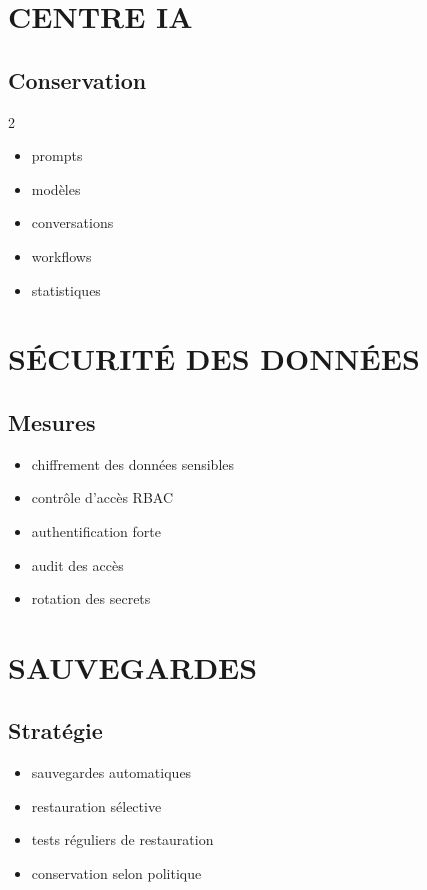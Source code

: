 \documentclass[12pt,a4paper,oneside]{book}
\begin{document}
\chapter{CENTRE IA}

\section{Conservation}
\begin{multicols}{2}
\begin{itemize}
\item prompts
\item modèles
\item conversations
\item workflows
\item statistiques
\end{itemize}
\end{multicols}

\chapter{SÉCURITÉ DES DONNÉES}

\section{Mesures}
\begin{itemize}
\item chiffrement des données sensibles
\item contrôle d'accès RBAC
\item authentification forte
\item audit des accès
\item rotation des secrets
\end{itemize}

\chapter{SAUVEGARDES}

\section{Stratégie}
\begin{itemize}
\item sauvegardes automatiques
\item restauration sélective
\item tests réguliers de restauration
\item conservation selon politique
\end{itemize}
\end{document}
